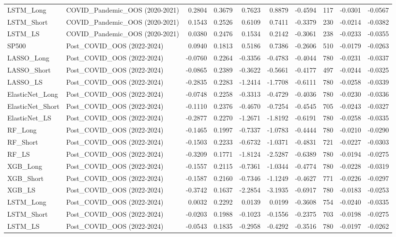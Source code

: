 \begin{tabular}{llrrrrrrrr}
\cline{1-10}
LSTM\_Long & COVID\_Pandemic\_OOS (2020-2021) & 0.2804 & 0.3679 & 0.7623 & 0.8879 & -0.4594 & 117 & -0.0301 & -0.0567 \\
\cline{1-10}
LSTM\_Short & COVID\_Pandemic\_OOS (2020-2021) & 0.1543 & 0.2526 & 0.6109 & 0.7411 & -0.3379 & 230 & -0.0214 & -0.0382 \\
\cline{1-10}
LSTM\_LS & COVID\_Pandemic\_OOS (2020-2021) & 0.0380 & 0.2476 & 0.1534 & 0.2142 & -0.3061 & 238 & -0.0233 & -0.0355 \\
\cline{1-10}
SP500 & Post\_COVID\_OOS (2022-2024) & 0.0940 & 0.1813 & 0.5186 & 0.7386 & -0.2606 & 510 & -0.0179 & -0.0263 \\
\cline{1-10}
LASSO\_Long & Post\_COVID\_OOS (2022-2024) & -0.0760 & 0.2264 & -0.3356 & -0.4783 & -0.4044 & 780 & -0.0231 & -0.0337 \\
\cline{1-10}
LASSO\_Short & Post\_COVID\_OOS (2022-2024) & -0.0865 & 0.2389 & -0.3622 & -0.5661 & -0.4177 & 497 & -0.0244 & -0.0325 \\
\cline{1-10}
LASSO\_LS & Post\_COVID\_OOS (2022-2024) & -0.2835 & 0.2283 & -1.2414 & -1.7708 & -0.6111 & 780 & -0.0258 & -0.0339 \\
\cline{1-10}
ElasticNet\_Long & Post\_COVID\_OOS (2022-2024) & -0.0748 & 0.2258 & -0.3313 & -0.4729 & -0.4036 & 780 & -0.0230 & -0.0336 \\
\cline{1-10}
ElasticNet\_Short & Post\_COVID\_OOS (2022-2024) & -0.1110 & 0.2376 & -0.4670 & -0.7254 & -0.4545 & 705 & -0.0243 & -0.0327 \\
\cline{1-10}
ElasticNet\_LS & Post\_COVID\_OOS (2022-2024) & -0.2877 & 0.2270 & -1.2671 & -1.8192 & -0.6191 & 780 & -0.0258 & -0.0335 \\
\cline{1-10}
RF\_Long & Post\_COVID\_OOS (2022-2024) & -0.1465 & 0.1997 & -0.7337 & -1.0783 & -0.4444 & 780 & -0.0210 & -0.0290 \\
\cline{1-10}
RF\_Short & Post\_COVID\_OOS (2022-2024) & -0.1503 & 0.2233 & -0.6732 & -1.0371 & -0.4831 & 721 & -0.0227 & -0.0303 \\
\cline{1-10}
RF\_LS & Post\_COVID\_OOS (2022-2024) & -0.3209 & 0.1771 & -1.8124 & -2.5287 & -0.6389 & 780 & -0.0194 & -0.0275 \\
\cline{1-10}
XGB\_Long & Post\_COVID\_OOS (2022-2024) & -0.1557 & 0.2115 & -0.7361 & -1.0344 & -0.4774 & 780 & -0.0228 & -0.0319 \\
\cline{1-10}
XGB\_Short & Post\_COVID\_OOS (2022-2024) & -0.1587 & 0.2160 & -0.7346 & -1.1249 & -0.4627 & 771 & -0.0226 & -0.0297 \\
\cline{1-10}
XGB\_LS & Post\_COVID\_OOS (2022-2024) & -0.3742 & 0.1637 & -2.2854 & -3.1935 & -0.6917 & 780 & -0.0183 & -0.0253 \\
\cline{1-10}
LSTM\_Long & Post\_COVID\_OOS (2022-2024) & 0.0032 & 0.2292 & 0.0139 & 0.0199 & -0.3608 & 754 & -0.0240 & -0.0335 \\
\cline{1-10}
LSTM\_Short & Post\_COVID\_OOS (2022-2024) & -0.0203 & 0.1988 & -0.1023 & -0.1556 & -0.2375 & 703 & -0.0198 & -0.0275 \\
\cline{1-10}
LSTM\_LS & Post\_COVID\_OOS (2022-2024) & -0.0543 & 0.1835 & -0.2958 & -0.4292 & -0.3516 & 780 & -0.0197 & -0.0262 \\
\cline{1-10}
\bottomrule
\end{tabular}
